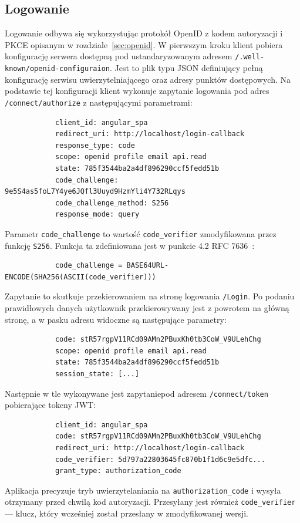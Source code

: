 	\subsection{Logowanie}
		Logowanie odbywa się wykorzystując protokół OpenID z kodem autoryzacji i PKCE opisanym w rozdziale~\ref{sec:openid}.
		W pierwszym kroku klient pobiera konfigurację serwera dostępną pod ustandaryzowanym adresem \verb|/.well-known/openid-configuraion|.
		Jest to plik typu JSON definiujący pełną konfigurację serwisu uwierzytelniającego oraz adresy punktów dostępowych.
		Na podstawie tej konfiguracji klient wykonuje zapytanie logowania pod adres \verb|/connect/authorize| z następującymi parametrami:
		\begin{lstlisting}
			client_id: angular_spa
			redirect_uri: http://localhost/login-callback
			response_type: code
			scope: openid profile email api.read
			state: 785f3544ba2a4df896290ccf5fedd51b
			code_challenge: 9e5S4as5foL7Y4ye6JQfl3Uuyd9HzmYli4Y732RLqys
			code_challenge_method: S256
			response_mode: query
		\end{lstlisting}
		Parametr \verb|code_challenge| to wartość \verb|code_verifier| zmodyfikowana przez funkcję \verb|S256|.
		Funkcja ta zdefiniowana jest w punkcie 4.2 RFC 7636~\cite{PKCE}:
		\begin{lstlisting}
			code_challenge = BASE64URL-ENCODE(SHA256(ASCII(code_verifier)))
		\end{lstlisting}
		Zapytanie to skutkuje przekierowaniem na stronę logowania \verb|/Login|.
		Po podaniu prawidłowych danych użytkownik przekierowywany jest z powrotem na główną stronę, a w pasku adresu widoczne są następujące parametry:
		\begin{lstlisting}
			code: stR57rgpV11RCd09AMn2PBuxKh0tb3CoW_V9ULehChg
			scope: openid profile email api.read
			state: 785f3544ba2a4df896290ccf5fedd51b
			session_state: [...]
		\end{lstlisting}
		Następnie w tle wykonywane jest zapytaniepod adresem \verb|/connect/token|  pobierające tokeny JWT:
		\begin{lstlisting}
			client_id: angular_spa
			code: stR57rgpV11RCd09AMn2PBuxKh0tb3CoW_V9ULehChg
			redirect_uri: http://localhost/login-callback
			code_verifier: 5d797a22803645fc870b1f1d6c9e5dfc...
			grant_type: authorization_code
		\end{lstlisting}
		Aplikacja precyzuje tryb uwierzytelaniania na \verb|authorization_code| i wysyła otrzymany przed chwilą kod autoryzacji.
		Przesyłany jest również \verb|code_verifier| --- klucz, który wcześniej został przesłany w zmodyfikowanej wersji.
